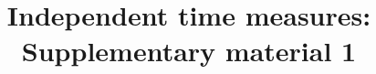 \documentclass{bmcart}
\begin{document}
\begin{frontmatter}

\begin{fmbox}


\title{Independent time measures: Supplementary material 1}


\author[
   addressref={aff1},                   %
   corref={aff1},                       %
   noteref={n1},                        %
   email={riffe@demogr.mpg.de}   %
]{ }
\author[
   addressref={aff2, aff3},
   email={cohen@mail.rockefeller.edu}
]{ }


\address[id=aff1]{%
}
\address[id=aff2]{%
}
\address[id=aff3]{%
}



\end{fmbox}
\end{frontmatter}
\end{document}
